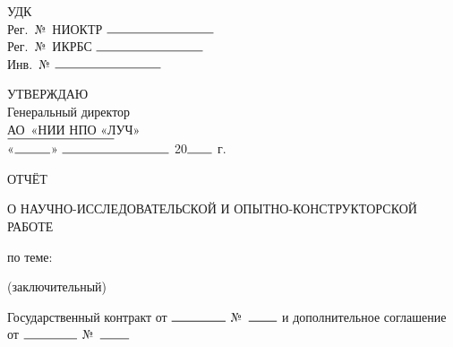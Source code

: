
\thispagestyle{empty}
\loochHat

\vspace{1cm}

\noindent
\begin{minipage}{0.45\textwidth}
УДК\\
Рег.~№~НИОКТР \(\rule{3cm}{0.5pt}\)\\
Рег.~№~ИКРБС  \(\rule{3cm}{0.5pt}\)\\
Инв.~№ \(\rule{3cm}{0.5pt}\)
\end{minipage}\hfill
\begin{minipage}{0.45\textwidth}
УТВЕРЖДАЮ\\
Генеральный директор    \\   
АО~«НИИ НПО «ЛУЧ»\\
\(\rule{3cm}{0.5pt}\) \loochDir \\
«\(\rule{1cm}{0.5pt}\)»   \(\rule{3cm}{0.5pt}\) 20\(\rule{0.7cm}{0.5pt}\) г.
\end{minipage}

\vspace{1cm}

\begin{center}
ОТЧЁТ

О НАУЧНО-ИССЛЕДОВАТЕЛЬСКОЙ И ОПЫТНО-КОНСТРУКТОРСКОЙ РАБОТЕ

\vspace{0.8cm}

по теме:

\loochFinRepTitle
 
(заключительный)

\vspace{0.8cm}


\vspace{0.8cm}

Государственный контракт от \(\rule{1.5cm}{0.5pt}\) №~\(\rule{0.8cm}{0.5pt}\) и дополнительное соглашение от \(\rule{1.5cm}{0.5pt}\) №~\(\rule{0.8cm}{0.5pt}\)
\end{center}

\vspace{2cm}

